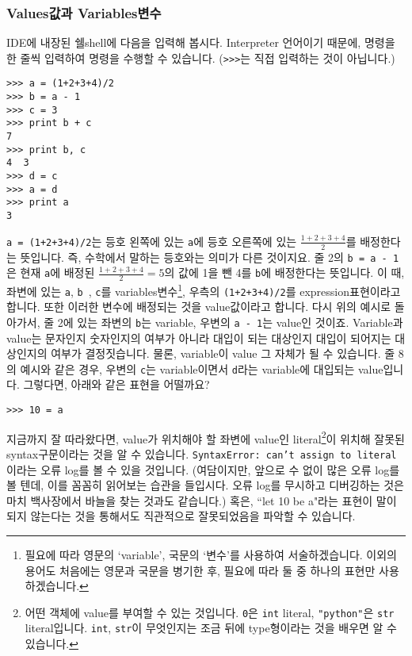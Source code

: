 \documentclass[../main.tex]{subfiles}
\begin{document}
\subsubsection{Values값과 Variables변수}
IDE에 내장된 쉘shell에 다음을 입력해 봅시다.
Interpreter 언어이기 때문에, 명령을 한 줄씩 입력하여 명령을 수행할 수 있습니다.
(\texttt{>>>}는 직접 입력하는 것이 아닙니다.)
\begin{verbatim}
>>> a = (1+2+3+4)/2
>>> b = a - 1
>>> c = 3
>>> print b + c
7
>>> print b, c
4  3
>>> d = c
>>> a = d
>>> print a
3
\end{verbatim}
\texttt{a = (1+2+3+4)/2}는 등호 왼쪽에 있는 \texttt{a}에 등호 오른쪽에 있는 $\frac{1+2+3+4}{2}$를 배정한다는 뜻입니다.
즉, 수학에서 말하는 등호와는 의미가 다른 것이지요.
줄 2의 \texttt{b = a - 1}은 현재 \texttt{a}에 배정된 $\frac{1+2+3+4}{2} = 5$의 값에 1을 뺀 4를 \texttt{b}에 배정한다는 뜻입니다.
이 때, 좌변에 있는 \texttt{a}, \texttt{b	}, \texttt{c}를 variables변수\footnote{필요에 따라 영문의 `variable', 국문의 `변수'를 사용하여 서술하겠습니다. 이외의 용어도 처음에는 영문과 국문을 병기한 후, 필요에 따라 둘 중 하나의 표현만 사용하겠습니다.}, 우측의 \texttt{(1+2+3+4)/2}를 expression표현이라고 합니다.
또한 이러한 변수에 배정되는 것을 value값이라고 합니다.
다시 위의 예시로 돌아가서, 줄 2에 있는 좌변의 \texttt{b}는 variable, 우변의 \texttt{a - 1}는 value인 것이죠.
Variable과 value는 문자인지 숫자인지의 여부가 아니라 대입이 되는 대상인지 대입이 되어지는 대상인지의 여부가 결정짓습니다.
물론, variable이 value 그 자체가 될 수 있습니다.
줄 8의 예시와 같은 경우, 우변의 \texttt{c}는 variable이면서 \texttt{d}라는 variable에 대입되는 value입니다.
그렇다면, 아래와 같은 표현을 어떨까요?
\begin{verbatim}
>>> 10 = a
\end{verbatim}
지금까지 잘 따라왔다면, value가 위치해야 할 좌변에 value인 literal\footnote{어떤 객체에 value를 부여할 수 있는 것입니다. \texttt{0}은 \texttt{int} literal, \texttt{"python"}은 \texttt{str} literal입니다. \texttt{int}, \texttt{str}이 무엇인지는 조금 뒤에 type형이라는 것을 배우면 알 수 있습니다.}이 위치해 잘못된 syntax구문이라는 것을 알 수 있습니다.
\texttt{SyntaxError: can't assign to literal}이라는 오류 log를 볼 수 있을 것입니다.
(여담이지만, 앞으로 수 없이 많은 오류 log를 볼 텐데, 이를 꼼꼼히 읽어보는 습관을 들입시다.
오류 log를 무시하고 디버깅하는 것은 마치 백사장에서 바늘을 찾는 것과도 같습니다.)
혹은, ``let 10 be a"라는 표현이 말이 되지 않는다는 것을 통해서도 직관적으로 잘못되었음을 파악할 수 있습니다.
\end{document}
